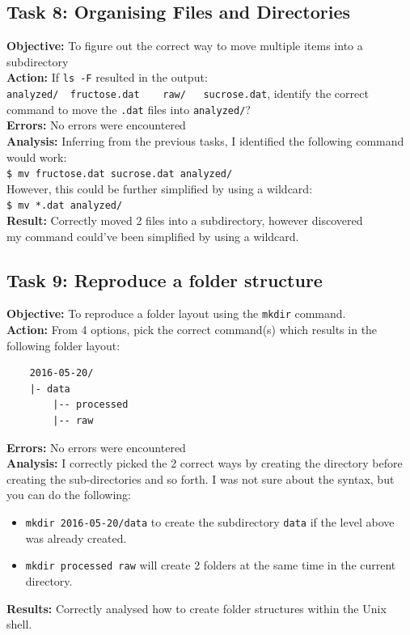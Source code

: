 \documentclass{article}
\begin{document}
\subsection{Task 8: Organising Files and Directories}
%
\textbf{Objective:} To figure out the correct way to move multiple items into a \\subdirectory\\
\textbf{Action:} If \verb|ls -F| resulted in the output:\\ \verb|analyzed/  fructose.dat    raw/   sucrose.dat|, identify the correct \\command to move the \verb|.dat| files into \verb|analyzed/|?\\
\textbf{Errors:} No errors were encountered\\
\textbf{Analysis:} Inferring from the previous tasks, I identified the following command would work:\\
\verb|$ mv fructose.dat sucrose.dat analyzed/|\\
However, this could be further simplified by using a wildcard:\\
\verb|$ mv *.dat analyzed/|\\
\textbf{Result:} Correctly moved 2 files into a subdirectory, however discovered\\ my command could've been simplified by using a wildcard.
%
\subsection{Task 9: Reproduce a folder structure}
%
\textbf{Objective:} To reproduce a folder layout using the \texttt{mkdir} command.\\
\textbf{Action:} From 4 options, pick the correct command(s) which results in the following folder layout:
\begin{verbatim}
    2016-05-20/
    |- data
        |-- processed
        |-- raw
\end{verbatim}
\textbf{Errors:} No errors were encountered\\
\textbf{Analysis:} I correctly picked the 2 correct ways by creating the directory before creating the sub-directories and so forth. I was not sure about the syntax, but you can do the following:
\begin{itemize}
    \item \verb|mkdir 2016-05-20/data| to create the subdirectory \verb|data| if the level above was already created.
    \item \verb|mkdir processed raw| will create 2 folders at the same time in the current directory.
\end{itemize}
\textbf{Results:} Correctly analysed how to create folder structures within the Unix shell.
\newpage
\end{document}
